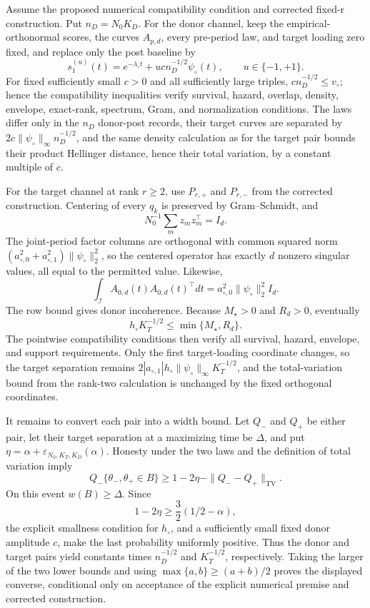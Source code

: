 Assume the proposed numerical compatibility condition and corrected fixed-r construction.  Put \(n_D=N_0K_D\).  For the donor channel, keep the empirical-orthonormal scores, the curves \(A_{p,d}\), every pre-period law, and target loading zero fixed, and replace only the post baseline by
\[
 s_1^{(u)}(t)=e^{-\lambda_\circ t}+u c n_D^{-1/2}\psi_\circ(t),
 \qquad u\in\{-1,+1\}.
\]
For fixed sufficiently small \(c>0\) and all sufficiently large triples, \(c n_D^{-1/2}\le v_\circ\); hence the compatibility inequalities verify survival, hazard, overlap, density, envelope, exact-rank, spectrum, Gram, and normalization conditions.  The laws differ only in the \(n_D\) donor-post records, their target curves are separated by \(2c\|\psi_\circ\|_\infty n_D^{-1/2}\), and the same density calculation as for the target pair bounds their product Hellinger distance, hence their total variation, by a constant multiple of \(c\).

For the target channel at rank \(r\ge2\), use \(P_{r,+}\) and \(P_{r,-}\) from the corrected construction.  Centering of every \(q_k\) is preserved by Gram--Schmidt, and
\[
 N_0^{-1}\sum_mz_mz_m^\top=I_d.
\]
The joint-period factor columns are orthogonal with common squared norm \((a_{\circ,0}^2+a_{\circ,1}^2)\|\psi_\circ\|_2^2\), so the centered operator has exactly \(d\) nonzero singular values, all equal to the permitted value.  Likewise,
\[
 \int_{\mathcal I}A_{0,d}(t)A_{0,d}(t)^\top dt
 =a_{\circ,0}^2\|\psi_\circ\|_2^2I_d.
\]
The row bound gives donor incoherence.  Because \(M_\star>0\) and \(R_d>0\), eventually
\[
 h_\circ K_T^{-1/2}\le\min\{M_\star,R_d\}.
\]
The pointwise compatibility conditions then verify all survival, hazard, envelope, and support requirements.  Only the first target-loading coordinate changes, so the target separation remains \(2|a_{\circ,1}|h_\circ\|\psi_\circ\|_\infty K_T^{-1/2}\), and the total-variation bound from the rank-two calculation is unchanged by the fixed orthogonal coordinates.

It remains to convert each pair into a width bound.  Let \(Q_-\) and \(Q_+\) be either pair, let their target separation at a maximizing time be \(\Delta\), and put \(\eta=\alpha+\varepsilon_{N_0,K_T,K_D}(\alpha)\).  Honesty under the two laws and the definition of total variation imply
\[
 Q_-\{\theta_-,\theta_+\in B\}
 \ge1-2\eta-\|Q_--Q_+\|_{\mathrm{TV}}.
\]
On this event \(w(B)\ge\Delta\).  Since
\[
 1-2\eta\ge\frac32(1/2-\alpha),
\]
the explicit smallness condition for \(h_\circ\), and a sufficiently small fixed donor amplitude \(c\), make the last probability uniformly positive.  Thus the donor and target pairs yield constants times \(n_D^{-1/2}\) and \(K_T^{-1/2}\), respectively.  Taking the larger of the two lower bounds and using \(\max\{a,b\}\ge(a+b)/2\) proves the displayed converse, conditional only on acceptance of the explicit numerical premise and corrected construction.
